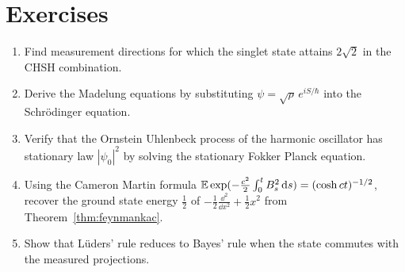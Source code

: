 \section*{Exercises}
\begin{enumerate}
\item Find measurement directions for which the singlet state attains $2\sqrt2$ in the CHSH combination.
\item Derive the Madelung equations by substituting $\psi = \sqrt\rho\,e^{iS/\hbar}$ into the Schr\"odinger equation.
\item Verify that the Ornstein Uhlenbeck process of the harmonic oscillator has stationary law $|\psi_0|^2$ by solving the stationary Fokker Planck equation.
\item Using the Cameron Martin formula $\mathbb{E}\exp(-\frac{c^2}{2}\int_0^tB_s^2\,\mathrm{d} s) = (\cosh ct)^{-1/2}$, recover the ground state energy $\frac12$ of $-\frac12\frac{\dd^2}{\dd x^2}+\frac12x^2$ from Theorem~\ref{thm:feynmankac}.
\item Show that L\"uders' rule reduces to Bayes' rule when the state commutes with the measured projections.
\end{enumerate}
